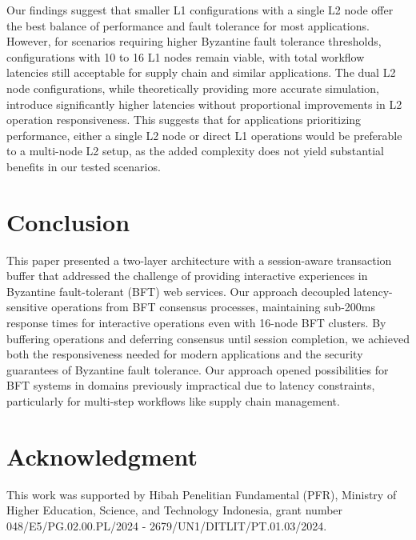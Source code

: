 \documentclass[conference]{IEEEtran}
\begin{document}
Our findings suggest that smaller L1 configurations with a single L2 node offer the best balance of performance and fault tolerance for most applications. However, for scenarios requiring higher Byzantine fault tolerance thresholds, configurations with 10 to 16 L1 nodes remain viable, with total workflow latencies still acceptable for supply chain and similar applications. The dual L2 node configurations, while theoretically providing more accurate simulation, introduce significantly higher latencies without proportional improvements in L2 operation responsiveness. This suggests that for applications prioritizing performance, either a single L2 node or direct L1 operations would be preferable to a multi-node L2 setup, as the added complexity does not yield substantial benefits in our tested scenarios.

\section{Conclusion}
\label{sec:conclusion}
This paper presented a two-layer architecture with a session-aware transaction buffer that addressed the challenge of providing interactive experiences in Byzantine fault-tolerant (BFT) web services. Our approach decoupled latency-sensitive operations from BFT consensus processes, maintaining sub-200ms response times for interactive operations even with 16-node BFT clusters. By buffering operations and deferring consensus until session completion, we achieved both the responsiveness needed for modern applications and the security guarantees of Byzantine fault tolerance. Our approach opened possibilities for BFT systems in domains previously impractical due to latency constraints, particularly for multi-step workflows like supply chain management.

\section*{Acknowledgment}
\noindent This work was supported by Hibah Penelitian Fundamental (PFR), Ministry of Higher Education, Science, and Technology Indonesia, grant number 048/E5/PG.02.00.PL/2024 - 2679/UN1/DITLIT/PT.01.03/2024.


\end{document}

